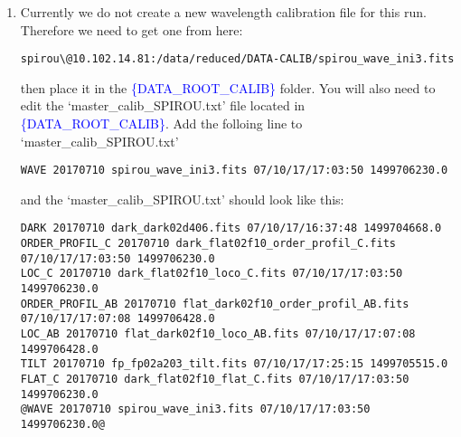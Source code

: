 \begin{enumerate}
\item Currently we do not create a new wavelength calibration file for this run. Therefore we need to get one from here:
\begin{lstlisting}[style=bashstyle]
spirou\@10.102.14.81:/data/reduced/DATA-CALIB/spirou_wave_ini3.fits
\end{lstlisting}  

\noindent then place it in the \textcolor{blue}{\{DATA\_ROOT\_CALIB\}} folder. You will also need to edit the `master\_calib\_SPIROU.txt' file located in \textcolor{blue}{\{DATA\_ROOT\_CALIB\}}. Add the folloing line to `master\_calib\_SPIROU.txt'
\begin{lstlisting}[style=text]
WAVE 20170710 spirou_wave_ini3.fits 07/10/17/17:03:50 1499706230.0
\end{lstlisting}

\noindent and the `master\_calib\_SPIROU.txt' should look like this:
\begin{lstlisting}[style=text]
DARK 20170710 dark_dark02d406.fits 07/10/17/16:37:48 1499704668.0
ORDER_PROFIL_C 20170710 dark_flat02f10_order_profil_C.fits 07/10/17/17:03:50 1499706230.0
LOC_C 20170710 dark_flat02f10_loco_C.fits 07/10/17/17:03:50 1499706230.0
ORDER_PROFIL_AB 20170710 flat_dark02f10_order_profil_AB.fits 07/10/17/17:07:08 1499706428.0
LOC_AB 20170710 flat_dark02f10_loco_AB.fits 07/10/17/17:07:08 1499706428.0
TILT 20170710 fp_fp02a203_tilt.fits 07/10/17/17:25:15 1499705515.0
FLAT_C 20170710 dark_flat02f10_flat_C.fits 07/10/17/17:03:50 1499706230.0
@WAVE 20170710 spirou_wave_ini3.fits 07/10/17/17:03:50 1499706230.0@
\end{lstlisting}


\end{enumerate}
